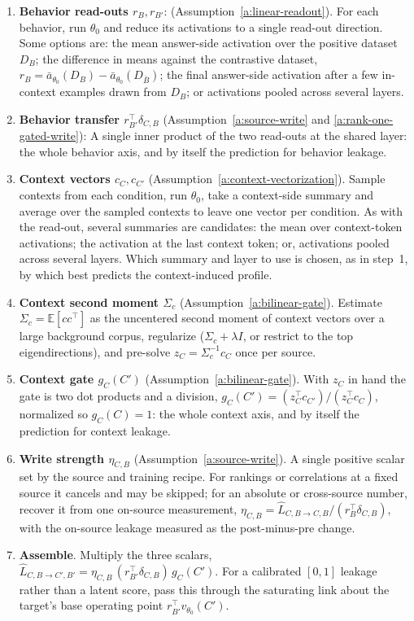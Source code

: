\documentclass[11pt]{article}
\theoremstyle{definition}
\theoremstyle{definition}
\theoremstyle{assumptionstyle}
\newcounter{prediction}
\newcommand{\E}{\mathbb{E}}            %
\newcommand{\disp}{\delta_{C,B}}
\begin{document}
\begin{enumerate}
  \item \textbf{Behavior read-outs $r_B,r_{B'}$}: (Assumption~\ref{a:linear-readout}). For
        each behavior, run $\theta_0$ and reduce its activations
        to a single read-out direction. Some options are: the mean answer-side
        activation over the positive dataset $D_B$; the difference in means against the
        contrastive dataset, $r_B=\bar a_{\theta_0}(D_B)-\bar a_{\theta_0}(D_{\bar B})$; the
        final answer-side activation after a few in-context examples drawn from $D_B$; or
        activations pooled across several layers. 
  \item \textbf{Behavior transfer $r_{B'}^\top \disp$} (Assumption~\ref{a:source-write} and \ref{a:rank-one-gated-write}):  A single inner
        product of the two read-outs at the shared layer: the whole behavior axis, and by
        itself the prediction for behavior leakage.
  \item \textbf{Context vectors $c_{C},c_{C'}$}
        (Assumption~\ref{a:context-vectorization}). Sample contexts from each condition,
        run $\theta_0$, take a context-side summary and average over the
        sampled contexts to leave one vector per condition. As with the read-out, several
        summaries are candidates: the mean over context-token activations; the activation
        at the last context token; or, activations pooled across several layers. Which
        summary and layer to use is chosen, as in step~1, by which best predicts the
        context-induced profile.
  \item \textbf{Context second moment $\Sigma_c$} (Assumption~\ref{a:bilinear-gate}). Estimate
        $\Sigma_c=\E[cc^\top]$ as the uncentered second moment of context vectors over a large
        background corpus, regularize ($\Sigma_c+\lambda I$, or restrict to the top
        eigendirections), and pre-solve $z_{C}=\Sigma_c^{-1}c_{C}$ once per source.
  \item \textbf{Context gate $g_{C}(C')$} (Assumption~\ref{a:bilinear-gate}). With
        $z_{C}$ in hand the gate is two dot products and a division,
        $g_{C}(C')=(z_{C}^\top c_{C'})/(z_{C}^\top c_{C})$, normalized so
        $g_{C}(C)=1$: the whole context axis, and by itself the prediction for context
        leakage.
  \item \textbf{Write strength $\eta_{C,B}$} (Assumption~\ref{a:source-write}). A single
        positive scalar set by the source and training recipe. For rankings or correlations
        at a fixed source it cancels and may be skipped; for an absolute or cross-source
        number, recover it from one on-source measurement,
        $\eta_{C,B}=\widehat L_{C,B\to C,B}/(r_B^\top\disp)$, with the on-source
        leakage measured as the post-minus-pre change.
  \item \textbf{Assemble}. Multiply the three scalars,
        $\widehat L_{C,B\to C',B'}=\eta_{C,B}\,(r_{B'}^\top \disp)\,g_{C}(C')$.
        For a calibrated $[0,1]$ leakage rather than a latent score, pass this through the
        saturating link about the target's base operating point $r_{B'}^\top
        v_{\theta_0}(C')$.
\end{enumerate}
\end{document}
